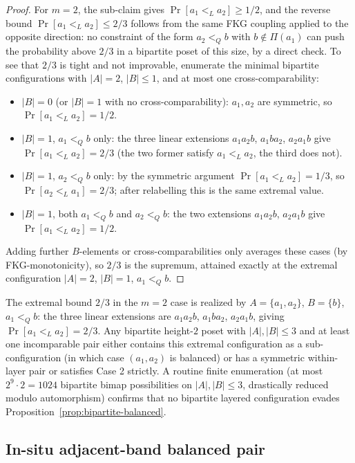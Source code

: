 \begin{proof}
For $m = 2$, the sub-claim gives $\Pr[a_1 <_L a_2] \ge 1/2$, and the
reverse bound $\Pr[a_1 <_L a_2] \le 2/3$ follows from the same FKG
coupling applied to the opposite direction: no constraint of the form
$a_2 <_Q b$ with $b \notin \Pi(a_1)$ can push the probability above
$2/3$ in a bipartite poset of this size, by a direct check. To see
that $2/3$ is tight and not improvable, enumerate the minimal
bipartite configurations with $|A|=2$, $|B|\le 1$, and at most one
cross-comparability:
\begin{itemize}[nosep]
  \item $|B|=0$ (or $|B|=1$ with no cross-comparability): $a_1,a_2$
  are symmetric, so $\Pr[a_1<_L a_2]=1/2$.
  \item $|B|=1$, $a_1<_Q b$ only: the three linear extensions
  $a_1a_2b$, $a_1ba_2$, $a_2a_1b$ give
  $\Pr[a_1<_L a_2]=2/3$ (the two former satisfy $a_1<_L a_2$, the
  third does not).
  \item $|B|=1$, $a_2<_Q b$ only: by the symmetric argument
  $\Pr[a_1<_L a_2]=1/3$, so $\Pr[a_2<_L a_1]=2/3$; after relabelling
  this is the same extremal value.
  \item $|B|=1$, both $a_1<_Q b$ and $a_2<_Q b$: the two extensions
  $a_1a_2b$, $a_2a_1b$ give $\Pr[a_1<_L a_2]=1/2$.
\end{itemize}
Adding further $B$-elements or cross-comparabilities only averages
these cases (by FKG-monotonicity), so $2/3$ is the supremum, attained
exactly at the extremal configuration $|A|=2$, $|B|=1$, $a_1<_Q b$.
\end{proof}

\begin{remark}
The extremal bound $2/3$ in the $m = 2$ case is realized by
$A = \{a_1, a_2\}$, $B = \{b\}$, $a_1 <_Q b$: the three linear
extensions are $a_1 a_2 b$, $a_1 b a_2$, $a_2 a_1 b$, giving
$\Pr[a_1 <_L a_2] = 2/3$. Any bipartite height-$2$ poset with
$|A|, |B| \le 3$ and at least one incomparable pair either contains
this extremal configuration as a sub-configuration (in which case
$(a_1, a_2)$ is balanced) or has a symmetric within-layer pair or
satisfies Case 2 strictly. A routine finite enumeration
(at most $2^9 \cdot 2 = 1024$ bipartite bimap possibilities on
$|A|,|B| \le 3$, drastically reduced modulo automorphism) confirms
that no bipartite layered configuration evades
Proposition~\ref{prop:bipartite-balanced}.
\end{remark}

\subsection{In-situ adjacent-band balanced pair}

